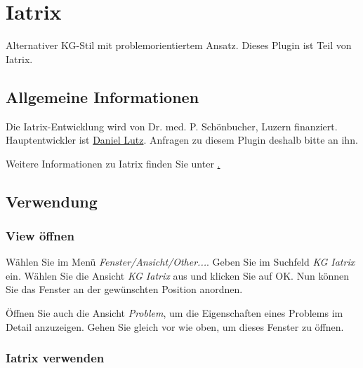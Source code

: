 
\section{Iatrix}\label{Iatrix}
Alternativer KG-Stil mit problemorientiertem Ansatz. Dieses Plugin ist Teil von Iatrix.

\subsection{Allgemeine Informationen}

Die Iatrix-Entwicklung wird von Dr. med. P. Schönbucher, Luzern finanziert.
Hauptentwickler ist \href{http://www.elexis.ch/jp/component/option,com_contact/task,view/contact_id,2/Itemid,32/}{Daniel Lutz}.
Anfragen zu diesem Plugin deshalb bitte an ihn.

Weitere Informationen zu Iatrix finden Sie unter \href{http://www.iatrix.org/}.

\subsection{Verwendung}

\subsubsection{View öffnen}

Wählen Sie im Menü \textit{Fenster/Ansicht/Other...}. Geben Sie im Suchfeld
\textit{KG Iatrix} ein. Wählen Sie die Ansicht \textit{KG Iatrix} aus
und klicken Sie auf OK. Nun können Sie das Fenster an der gewünschten Position
anordnen.

Öffnen Sie auch die Ansicht \textit{Problem}, um die Eigenschaften eines
Problems im Detail anzuzeigen. Gehen Sie gleich vor wie oben, um dieses Fenster
zu öffnen.

\subsubsection{Iatrix verwenden}

